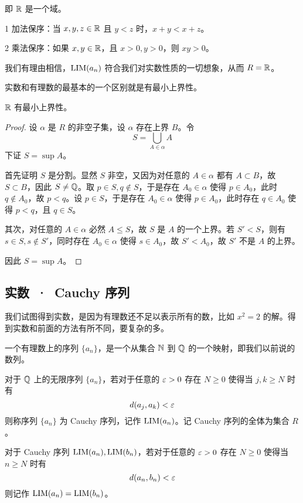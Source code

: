 即 $\RR$ 是一个域。

\begin{theorem}[$\RR$ 是有序域]
	\num{1} 加法保序：当 $x,y,z\in \mathbb{R}$ 且 $y<z$ 时，$x+y<x+z$。

	\num{2} 乘法保序：如果 $x,y\in \mathbb{R}$，且 $x>0,y>0$，则 $xy>0$。
\end{theorem}

我们有理由相信，$\operatorname{{LIM}}(a_n)$ 符合我们对实数性质的一切想象，从而 $R = \mathbb{R}$。

实数和有理数的最基本的一个区别就是有最小上界性。

\begin{theorem}
	$\RR$ 有最小上界性。
\end{theorem}
\begin{proof}
	设 $\alpha$ 是 $R$ 的非空子集，设 $\alpha$ 存在上界 $B$。令
	$$S = \bigcup_{A \in \alpha} A$$
	下证 $S = \sup A$。

	首先证明 $S$ 是分割。显然 $S$ 非空，又因为对任意的 $A\in \alpha$ 都有 $A \subset B$，故 $S \subset B$，因此 $S \ne \mathbb{Q}$。取 $p \in S,q\notin S$，于是存在 $A_0 \in \alpha$ 使得 $p \in A_0$，此时 $q \notin A_0$，故 $p<q$。设 $p \in S$，于是存在 $A_0 \in \alpha$ 使得 $p \in A_0$，此时存在 $q\in A_0$ 使得 $p < q$，且 $q \in S$。

	其次，对任意的 $A \in \alpha$ 必然 $A \leqslant S$，故 $S$ 是 $A$ 的一个上界。若 $S' < S$，则有 $s \in S, s \notin S'$，同时存在 $A_0 \in \alpha$ 使得 $s \in A_0$，故 $S' < A_0$，故 $S'$ 不是 $A$ 的上界。

	因此 $S = \sup A$。
\end{proof}

\subsection{实数\ ·\ Cauchy 序列}

我们试图得到实数，是因为有理数还不足以表示所有的数，比如 $x^2=2$ 的解。得到实数和前面的方法有所不同，要复杂的多。

一个有理数上的序列 $\{a_n\}$，是一个从集合 $\mathbb{N}$ 到 $\mathbb{Q}$ 的一个映射，即我们以前说的数列。

对于 $\mathbb{Q}$ 上的无限序列 $\{a_n\}$，若对于任意的 $\varepsilon > 0$ 存在 $N \geqslant 0$ 使得当 $j,k \geqslant N$ 时有 
$$d(a_j,a_k) < \varepsilon$$
则称序列 $\{a_n\}$ 为 Cauchy 序列，记作 $\operatorname{{LIM}}(a_n)$。记 Cauchy 序列的全体为集合 $R$。

对于 Cauchy 序列 $\operatorname{{LIM}}(a_n),\operatorname{{LIM}}(b_n)$，若对于任意的 $\varepsilon > 0$ 存在 $N \geqslant 0$ 使得当 $n \geqslant N$ 时有
$$d(a_n,b_n) < \varepsilon$$
则记作 $\operatorname{{LIM}}(a_n) = \operatorname{{LIM}}(b_n)$。


